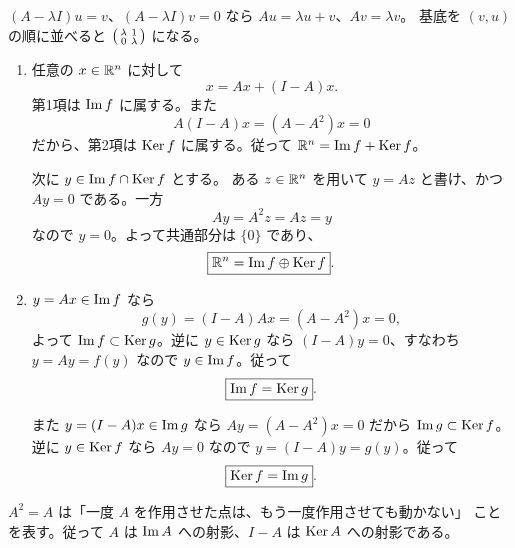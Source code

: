 \begin{pointbox}[確認]
\((A-\lambda I)u=v\)、\((A-\lambda I)v=0\) なら
\(Au=\lambda u+v\)、\(Av=\lambda v\)。
基底を \((v,u)\) の順に並べると
\(\begin{psmallmatrix}\lambda&1\\0&\lambda\end{psmallmatrix}\) になる。
\end{pointbox}


\begin{enumerate}
  \item 任意の \(x\in\mathbb R^n\) に対して
  \[
  x=Ax+(I-A)x.
  \]
  第1項は \(\operatorname{Im} f\) に属する。また
  \[
  A(I-A)x=(A-A^2)x=0
  \]
  だから、第2項は \(\operatorname{Ker} f\) に属する。従って
  \(\mathbb R^n=\operatorname{Im} f+\operatorname{Ker} f\)。

  次に \(y\in\operatorname{Im} f\cap\operatorname{Ker} f\) とする。
  ある \(z\in\mathbb R^n\) を用いて \(y=Az\) と書け、かつ \(Ay=0\) である。一方
  \[
  Ay=A^2z=Az=y
  \]
  なので \(y=0\)。よって共通部分は \(\{0\}\) であり、
  \[
  \boxed{\mathbb R^n=\operatorname{Im} f\oplus\operatorname{Ker} f}.
  \]

  \item \(y=Ax\in\operatorname{Im} f\) なら
  \[
  g(y)=(I-A)Ax=(A-A^2)x=0,
  \]
  よって \(\operatorname{Im} f\subset\operatorname{Ker} g\)。逆に \(y\in\operatorname{Ker} g\) なら
  \((I-A)y=0\)、すなわち \(y=Ay=f(y)\) なので
  \(y\in\operatorname{Im} f\)。従って
  \[
  \boxed{\operatorname{Im} f=\operatorname{Ker} g}.
  \]

  また \(y=(I-A)x\in\operatorname{Im} g\) なら
  \(Ay=(A-A^2)x=0\) だから \(\operatorname{Im} g\subset\operatorname{Ker} f\)。
  逆に \(y\in\operatorname{Ker} f\) なら \(Ay=0\) なので
  \(y=(I-A)y=g(y)\)。従って
  \[
  \boxed{\operatorname{Ker} f=\operatorname{Im} g}.
  \]
\end{enumerate}

\begin{pointbox}[見方]
\(A^2=A\) は「一度 \(A\) を作用させた点は、もう一度作用させても動かない」
ことを表す。従って \(A\) は \(\operatorname{Im} A\) への射影、\(I-A\) は \(\operatorname{Ker} A\) への射影である。
\end{pointbox}



